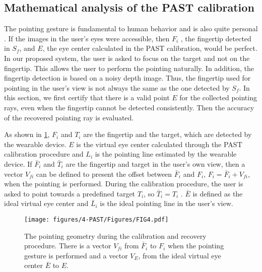 \subsection{Mathematical analysis of the PAST calibration}
The pointing gesture is fundamental to human behavior and is also quite personal \citep{Matthews2012}. If the images in the user's eyes were accessible, then $F_i$ , the fingertip detected in $S_f$, and $E$, the eye center calculated in the PAST calibration, would be perfect. 
In our proposed system, the user is asked to focus on the target and not on the fingertip. This allows the user to perform the pointing naturally.
In addition, the fingertip detection is based on a noisy depth image.
Thus, the fingertip used for pointing in the user's view is not always the same as the one detected by $S_f$. 
In this section, we first certify that there is a valid point $E$ for the collected pointing rays, even when the fingertip cannot be detected consistently. Then the accuracy of the recovered pointing ray is evaluated.

{As shown in \figurename{ \ref{fig:fingertipOffset}}, $F_i$  and $T_i$  are the fingertip and the target, which are detected by the wearable device. $E$ is the virtual eye center calculated through the PAST calibration procedure and $L_i$ is the pointing line estimated by the wearable device. If $\bar F_i$ and $\bar T_i$ are the fingertip and target in the user's own view, then a vector $V_{fi}$ can be defined to present the offset between $\bar F_i$ and $F_i$, $F_i = {\bar F_i} + V_{fi}$, when the pointing is performed.
During the calibration procedure, the user is asked to point towards a predefined target $T_i$, so ${\bar T_i} = T_i$ .
$\bar E$ is defined as the ideal virtual eye center and $\bar L_i$ is the ideal pointing line in the user's view. }
\begin{figure} 
	\centering
	\texttt{[image: figures/4-PAST/Figures/FIG4.pdf]}
	\caption{ The pointing geometry during the calibration and recovery procedure. There is a vector $V_{fi}$  from $\bar F_i$ to $F_i$ when the pointing gesture is performed and a vector $V_{E}$, from the ideal virtual eye center ${\bar E}$ to $E$.}
	\label{fig:fingertipOffset}
\end{figure}
